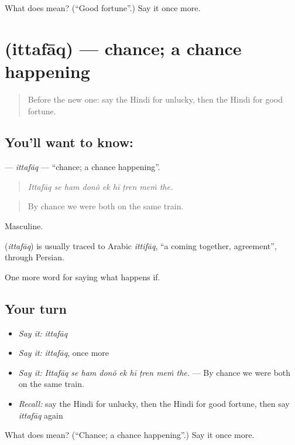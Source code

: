 \begin{tcolorbox}[breakable,colback=teal!4,colframe=teal!35!black,title={Before you move on}]
What does  mean? (\textquotedblleft{}Good fortune\textquotedblright{}.) Say it once more.
\end{tcolorbox}
\section[\texorpdfstring{\hi{इत्तफ़ाक़} (ittafāq)}{इत्तफ़ाक़ (ittafāq)}]{ (ittafāq) — chance; a chance happening}

\label{lesson:HI-C546-ittafaq}



\begin{quote}
Before the new one: say the Hindi for unlucky, then the Hindi for good fortune.
\end{quote}

\subsection*{You'll want to know: }
\textbf{} — \emph{ittafāq} — \textquotedblleft{}chance; a chance happening\textquotedblright{}.

\begin{quote}
        
\end{quote}

\begin{quote}
\emph{Ittafāq se ham donõ ek hī ṭren meṁ the.}
\end{quote}

\begin{quote}
By chance we were both on the same train.
\end{quote}

Masculine.

\begin{cousinweb}
\textbf{} (\emph{ittafāq}) is usually traced to Arabic \emph{ittifāq}, \textquotedblleft{}a coming together, agreement\textquotedblright{}, through Persian.
\end{cousinweb}

\begin{grammarlens}[title={What you've built}]
One more word for saying what happens if.
\end{grammarlens}

\subsection*{Your turn}
\begin{itemize}
\raggedright
  \item \emph{Say it:} \emph{ittafāq}
  \item \emph{Say it:} \emph{ittafāq}, once more
  \item \emph{Say it:} \emph{Ittafāq se ham donõ ek hī ṭren meṁ the.} — By chance we were both on the same train.
  \item \emph{Recall:} say the Hindi for unlucky, then the Hindi for good fortune, then say \emph{ittafāq} again
\end{itemize}

\begin{tcolorbox}[breakable,colback=teal!4,colframe=teal!35!black,title={Before you move on}]
What does  mean? (\textquotedblleft{}Chance; a chance happening\textquotedblright{}.) Say it once more.
\end{tcolorbox}
